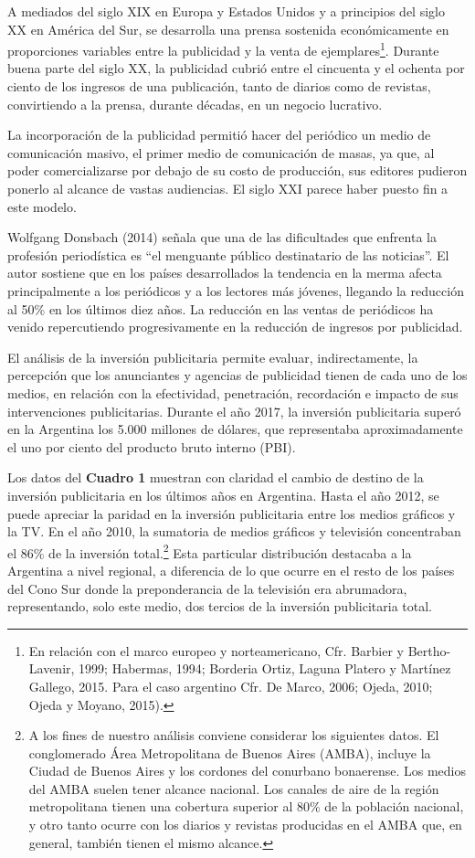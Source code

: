 A mediados del siglo XIX en Europa y Estados Unidos y a principios del siglo XX en América del Sur, se desarrolla una prensa sostenida económicamente en proporciones variables entre la publicidad y la venta de ejemplares\footnote{En relación con el marco europeo y norteamericano, Cfr. Barbier y Bertho-Lavenir, 1999; Habermas, 1994; Borderia Ortiz, Laguna Platero y Martínez Gallego, 2015. Para el caso argentino Cfr. De Marco, 2006; Ojeda, 2010; Ojeda y Moyano, 2015).}. Durante buena parte del siglo XX, la publicidad cubrió entre el cincuenta y el ochenta por ciento de los ingresos de una publicación, tanto de diarios como de revistas, convirtiendo a la prensa, durante décadas, en un negocio lucrativo.

La incorporación de la publicidad permitió hacer del periódico un medio de comunicación masivo, el primer medio de comunicación de masas, ya que, al poder comercializarse por debajo de su costo de producción, sus editores pudieron ponerlo al alcance de vastas audiencias. El siglo XXI parece haber puesto fin a este modelo.

Wolfgang Donsbach (2014) señala que una de las dificultades que enfrenta la profesión periodística es \enquote{el menguante público destinatario de las noticias}. El autor sostiene que en los países desarrollados la tendencia en la merma afecta principalmente a los periódicos y a los lectores más jóvenes, llegando la reducción al 50\% en los últimos diez años. La reducción en las ventas de periódicos ha venido repercutiendo progresivamente en la reducción de ingresos por publicidad.

El análisis de la inversión publicitaria  permite evaluar, indirectamente, la percepción que los anunciantes y agencias de publicidad tienen de cada uno de los medios, en relación con la efectividad, penetración, recordación e impacto de sus intervenciones publicitarias. Durante el año 2017, la inversión publicitaria superó en la Argentina los 5.000 millones de dólares, que representaba aproximadamente el uno por ciento del producto bruto interno (PBI).

Los datos del \textbf{Cuadro 1} muestran con claridad el cambio de destino de la inversión publicitaria en los últimos años en Argentina. Hasta el año 2012, se puede apreciar la paridad en la inversión publicitaria entre los medios gráficos y la TV. En el año 2010, la sumatoria de medios gráficos y televisión concentraban el 86\% de la inversión total.\footnote{A los fines de nuestro análisis conviene considerar los siguientes datos. El conglomerado Área Metropolitana de Buenos Aires (AMBA), incluye la Ciudad de Buenos Aires y los cordones del conurbano bonaerense. Los medios del AMBA suelen tener alcance nacional. Los canales de aire de la región metropolitana tienen una cobertura superior al 80\% de la población nacional, y otro tanto ocurre con los diarios y revistas producidas en el AMBA que, en general, también tienen el mismo alcance.} Esta particular distribución destacaba a la Argentina a nivel regional, a diferencia de lo que ocurre en el resto de los países del Cono Sur donde la preponderancia de la televisión era  abrumadora, representando, solo este medio, dos tercios de la inversión publicitaria total.

